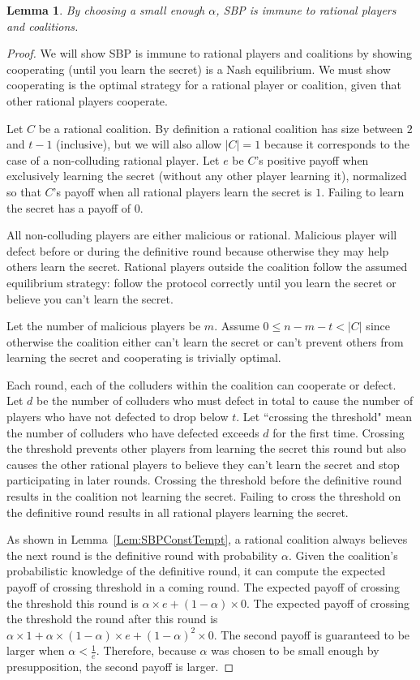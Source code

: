 \documentclass[12pt]{dalcsthesis}
\newtheorem{lemma}{Lemma}
\begin{document}
\begin{lemma}\label{Lem:SBPRatNash}By choosing a small enough $\alpha$, SBP is immune to rational players and coalitions.\end{lemma}
\begin{proof}
We will show SBP is immune to rational players and coalitions by showing cooperating (until you learn the secret) is a Nash equilibrium. We must show cooperating is the optimal strategy for a rational player or coalition, given that other rational players cooperate.

Let $C$ be a rational coalition. By definition a rational coalition has size between $2$ and $t-1$ (inclusive), but we will also allow $|C| = 1$ because it corresponds to the case of a non-colluding rational player. Let $e$ be $C$'s positive payoff when exclusively learning the secret (without any other player learning it), normalized so that $C$'s payoff when all rational players learn the secret is $1$. Failing to learn the secret has a payoff of 0.

All non-colluding players are either malicious or rational. Malicious player will defect before or during the definitive round because otherwise they may help others learn the secret. Rational players outside the coalition follow the assumed equilibrium strategy: follow the protocol correctly until you learn the secret or believe you can't learn the secret.

Let the number of malicious players be $m$. Assume $0 \leq n - m - t < |C|$ since otherwise the coalition either can't learn the secret or can't prevent others from learning the secret and cooperating is trivially optimal.

Each round, each of the colluders within the coalition can cooperate or defect. Let $d$ be the number of colluders who must defect in total to cause the number of players who have not defected to drop below $t$. Let ``crossing the threshold" mean the number of colluders who have defected exceeds $d$ for the first time. Crossing the threshold prevents other players from learning the secret this round but also causes the other rational players to believe they can't learn the secret and stop participating in later rounds. Crossing the threshold before the definitive round results in the coalition not learning the secret. Failing to cross the threshold on the definitive round results in all rational players learning the secret.

As shown in Lemma~\ref{Lem:SBPConstTempt}, a rational coalition always believes the next round is the definitive round with probability $\alpha$. Given the coalition's probabilistic knowledge of the definitive round, it can compute the expected payoff of crossing threshold in a coming round. The expected payoff of crossing the threshold this round is $\alpha \times e + (1-\alpha) \times 0$. The expected payoff of crossing the threshold the round after this round is $\alpha \times 1 + \alpha \times (1-\alpha) \times e + (1-\alpha)^2 \times 0$. The second payoff is guaranteed to be larger when $\alpha < \frac{1}{e}$. Therefore, because $\alpha$ was chosen to be small enough by presupposition, the second payoff is larger.


\end{proof}
\end{document}
